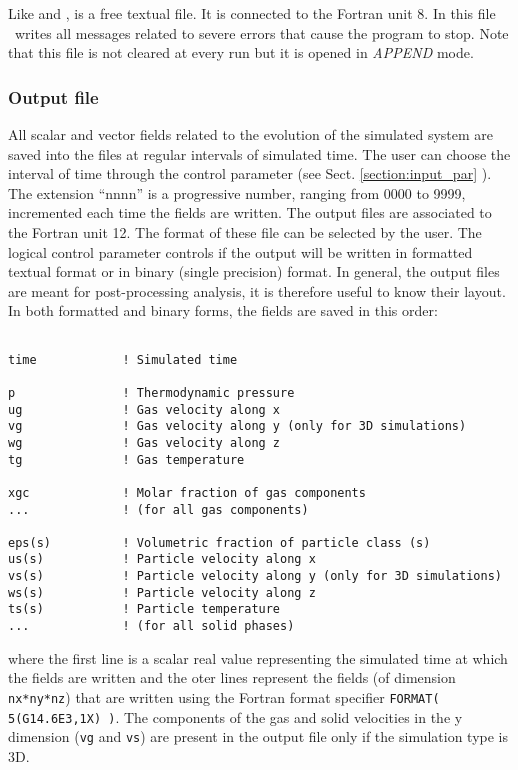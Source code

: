 Like  and ,  is a free textual file.
It is connected to the Fortran unit 8. In this file \PDAC\ writes
all messages related to severe errors that cause the program to stop.
Note that this file is not cleared at every run but it is opened in 
{\it APPEND} mode.

\subsubsection{Output file}

All scalar and vector fields related to the evolution of the simulated
system are saved into the  files at regular intervals of
simulated time. The user can choose the interval of time through
the control parameter  (see Sect. \ref{section:input_par} ).
The extension ``nnnn'' is a progressive number, ranging from 0000 to 9999, 
incremented each time the fields are written. 
The output files are associated to the Fortran unit 12. 
The format of these file can be selected by the user.
The logical control parameter  controls if the
output will be written in formatted textual format
or in binary (single precision) format. In general, the output files 
are meant for post-processing analysis, it is therefore useful to know 
their layout. In both formatted and binary forms, the fields are saved
in this order:

\begin{verbatim}

time            ! Simulated time

p               ! Thermodynamic pressure
ug              ! Gas velocity along x
vg              ! Gas velocity along y (only for 3D simulations)
wg              ! Gas velocity along z
tg              ! Gas temperature

xgc             ! Molar fraction of gas components
...             ! (for all gas components)

eps(s)          ! Volumetric fraction of particle class (s)
us(s)           ! Particle velocity along x
vs(s)           ! Particle velocity along y (only for 3D simulations)
ws(s)           ! Particle velocity along z
ts(s)           ! Particle temperature
...             ! (for all solid phases)

\end{verbatim}

where the first line is a scalar real value representing the 
simulated time at which the fields are written and the oter lines
represent the fields (of dimension {\tt nx*ny*nz}) that are written 
using the Fortran format specifier {\tt FORMAT( 5(G14.6E3,1X) )}.
The components of the gas and solid velocities in the y dimension
({\tt vg} and {\tt vs}) are present in the output file only if the simulation
type is 3D.

